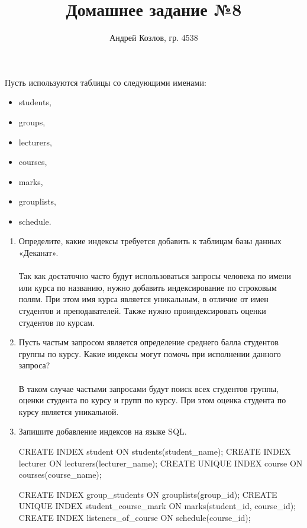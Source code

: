 \documentclass[10pt, a4paper]{article}
\title{Домашнее задание №8}
\author{Андрей Козлов, гр. 4538}
\date{}
\begin{document}
\maketitle

Пусть используются таблицы со следующими именами:
\begin{itemize}
	\item students,
	\item groups,
	\item lecturers,
	\item courses,
	\item marks,
	\item grouplists,
	\item schedule.
\end{itemize}

\begin{enumerate}
	\item Определите, какие индексы требуется добавить к таблицам базы данных «Деканат».\\\\
Так как достаточно часто будут использоваться запросы человека по имени или курса по названию, нужно добавить индексирование по строковым полям. При этом имя курса является уникальным, в отличие от имен студентов и преподавателей.
Также нужно проиндексировать оценки студентов по курсам.

	\item Пусть частым запросом является определение среднего балла студентов группы по курсу. Какие индексы могут помочь при исполнении данного запроса?\\\\
В таком случае частыми запросами будут поиск всех студентов группы, оценки студента по курсу и групп по курсу. При этом оценка студента по курсу является уникальной.

	\item Запишите добавление индексов на языке SQL.
	\begin{sql}
CREATE INDEX student ON students(student_name);
CREATE INDEX lecturer ON lecturers(lecturer_name);
CREATE UNIQUE INDEX course ON courses(course_name);

CREATE INDEX group_students ON grouplists(group_id);
CREATE UNIQUE INDEX student_course_mark ON marks(student_id, course_id);
CREATE INDEX listeners_of_course ON schedule(course_id);
	\end{sql}
\end{enumerate}
\end{document}
